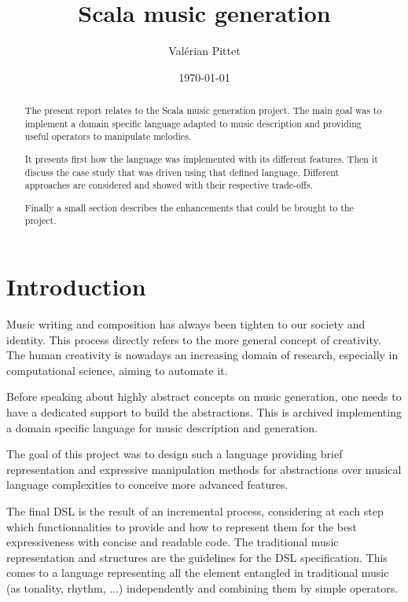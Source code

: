 \documentclass[twocolumn, 11pt]{article}
\begin{document}
\newcommand{\lln}[1]{
  \lstinline@#1@
}

\title{Scala music generation}
\author{Val\'erian Pittet}
\date{\today}

\onecolumn

\maketitle
\begin{abstract}

The present report relates to the Scala music generation project. The main goal was to implement a domain specific language adapted to music description and providing useful operators to manipulate melodies.

It presents first how the language was implemented with its different features.
Then it discuss the case study that was driven using that defined language. Different approaches are considered and showed with their respective trade-offs.

Finally a small section describes the enhancements that could be brought to the project.


\end{abstract}
\tableofcontents

\twocolumn
\section{Introduction}

Music writing and composition has always been tighten to our society and identity.
This process directly refers to the more general concept of creativity.
The human creativity is nowadays an increasing domain of research, especially in computational science, aiming to automate it.

Before speaking about highly abstract concepts on music generation, one needs to have a dedicated support to build the abstractions.
This is archived implementing a domain specific language for music description and generation.

The goal of this project was to design such a language providing brief representation and expressive manipulation methods
for abstractions over musical language complexities to conceive more advanced features.

The final DSL is the result of an incremental process, considering at each step which functionnalities to provide and how to represent them for the best expressiveness with concise and readable code.
The traditional music representation and structures are the guidelines for the DSL specification. This comes to a language representing all the element entangled in traditional music (as tonality, rhythm, ...) independently and combining them by simple operators.
\end{document}

